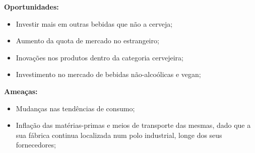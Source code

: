 \noindent \textbf{Oportunidades:}

\begin{itemize}
\item Investir mais em outras bebidas que não a cerveja; 

\item Aumento da quota de mercado no estrangeiro; 

\item Inovações nos produtos dentro da categoria cervejeira; 

\item Investimento no mercado de bebidas não-alcoólicas e vegan; 
\end{itemize}

\noindent \textbf{Ameaças:}
\begin{itemize}
    
\item Mudanças nas tendências de consumo; 

\item Inflação das matérias-primas e meios de transporte das mesmas, dado que a sua fábrica continua localizada num polo industrial, longe dos seus fornecedores; 
\end{itemize}


